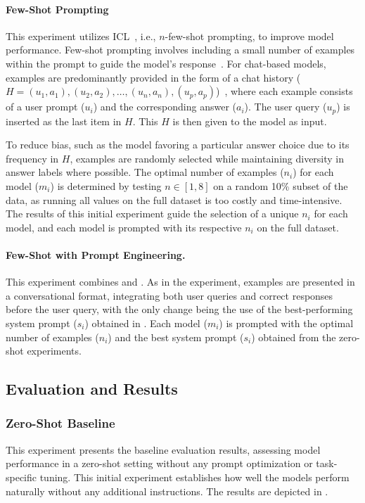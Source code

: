 \paragraph{Few-Shot Prompting}
\label{few-shot-prompt}

This experiment utilizes \ac{ICL}~\cite{brownLanguageModelsAre2020}, i.e., $n$-few-shot prompting, to improve model performance. Few-shot prompting involves including a small number of examples within the prompt to guide the model's response~\cite{brownLanguageModelsAre2020}. For chat-based models, examples are predominantly provided in the form of a chat history ($H = (u_1, a_1), (u_2, a_2), \ldots, (u_n, a_n), (u_p, a_p)$)~\cite{HowUseFew}, where each example consists of a user prompt ($u_i$) and the corresponding answer ($a_i$). The user query ($u_p$) is inserted as the last item in $H$. This $H$ is then given to the model as input.

To reduce bias, such as the model favoring a particular answer choice due to its frequency in $H$, examples are randomly selected while maintaining diversity in answer labels where possible. The optimal number of examples ($n_i$) for each model ($m_i$) is determined by testing $n \in [1, 8]$ on a random 10\% subset of the data, as running all values on the full dataset is too costly and time-intensive. The results of this initial experiment guide the selection of a unique $n_i$ for each model, and each model is prompted with its respective $n_i$ on the full dataset.

\paragraph{Few-Shot with Prompt Engineering.}
This experiment combines  and . As in the  experiment, examples are presented in a conversational format, integrating both user queries and correct responses before the user query, with the only change being the use of the best-performing system prompt ($s_i$) obtained in . Each model ($m_i$) is prompted with the optimal number of examples ($n_i$) and the best system prompt ($s_i$) obtained from the zero-shot experiments.

\subsection{Evaluation and Results}

\subsubsection{Zero-Shot Baseline}
This experiment presents the baseline evaluation results, assessing model performance in a zero-shot setting without any prompt optimization or task-specific tuning. This initial experiment establishes how well the models perform naturally without any additional instructions. The results are depicted in .

